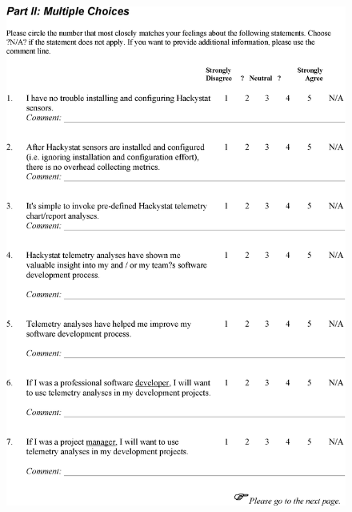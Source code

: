 \begin{figure}[p]
  \includegraphics[height=1.00\textheight]{figures/ClassroomSurveyPage2}
\end{figure}
 
